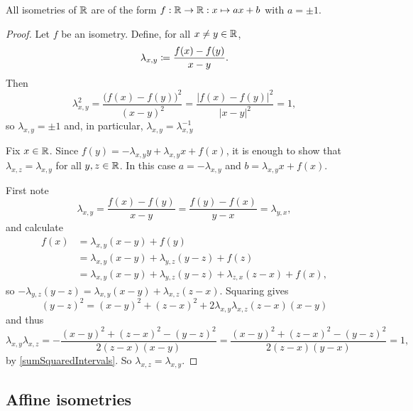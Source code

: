 \begin{lemma}
All isometries of $\mathbb{R}$ are of the form $f: \mathbb{R}\to\mathbb{R}: x\mapsto ax+b$ with $a = \pm 1$.
\end{lemma}
\begin{proof}
Let $f$ be an isometry. Define, for all $x\neq y\in \mathbb{R}$,
\[ \lambda_{x,y} \coloneqq \frac{f(x)-f(y)}{x-y}. \]
Then
\[ \lambda_{x,y}^2 = \frac{\big(f(x)-f(y)\big)^2}{(x-y)^2} = \frac{\big|f(x)-f(y)\big|^2}{|x-y|^2} = 1, \]
so $\lambda_{x,y} = \pm 1$ and, in particular, $\lambda_{x,y} = \lambda_{x,y}^{-1}$


Fix $x\in \mathbb{R}$. Since $f(y) = -\lambda_{x,y}y +\lambda_{x,y}x + f(x)$, it is enough to show that $\lambda_{x,z} = \lambda_{x,y}$ for all $y,z\in \mathbb{R}$. In this case $a = -\lambda_{x,y}$ and $b = \lambda_{x,y}x + f(x)$.

First note
\[ \lambda_{x,y} = \frac{f(x)-f(y)}{x-y} = \frac{f(y)-f(x)}{y-x} = \lambda_{y,x}, \]
and calculate
\begin{align*}
f(x) &= \lambda_{x,y}(x-y) + f(y) \\
&= \lambda_{x,y}(x-y) + \lambda_{y,z}(y-z) + f(z) \\
&= \lambda_{x,y}(x-y) + \lambda_{y,z}(y-z) + \lambda_{z,x}(z-x) + f(x),
\end{align*}
so $-\lambda_{y,z}(y-z) = \lambda_{x,y}(x-y) + \lambda_{x,z}(z-x)$. Squaring gives
\[ (y-z)^2 = (x-y)^2 + (z-x)^2 + 2\lambda_{x,y}\lambda_{x,z}(z-x)(x-y) \]
and thus
\[ \lambda_{x,y}\lambda_{x,z} = - \frac{(x-y)^2 + (z-x)^2 - (y-z)^2}{2(z-x)(x-y)} = \frac{(x-y)^2 + (z-x)^2 - (y-z)^2}{2(z-x)(y-x)} = 1, \]
by \ref{sumSquaredIntervals}. So $\lambda_{x,z} = \lambda_{x,y}$.
\end{proof}

\subsection{Affine isometries}


